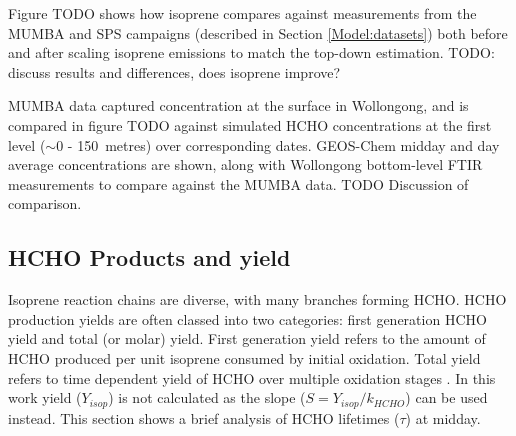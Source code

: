     
    Figure TODO shows how isoprene compares against measurements from the MUMBA and SPS campaigns (described in Section \ref{Model:datasets}) both before and after scaling isoprene emissions to match the top-down estimation.
    TODO: discuss results and differences, does isoprene improve?
    
    
    MUMBA data captured concentration at the surface in Wollongong, and is compared in figure TODO against simulated HCHO concentrations at the first level ($\sim$0 - 150~metres) over corresponding dates.
    GEOS-Chem midday and day average concentrations are shown, along with Wollongong bottom-level FTIR measurements to compare against the MUMBA data.
    TODO Discussion of comparison.
  
    
  \subsection{HCHO Products and yield}
    \label{BioIsop:results:HCHOYield}
    
    Isoprene reaction chains are diverse, with many branches forming HCHO.
    HCHO production yields are often classed into two categories: first generation HCHO yield and total (or molar) yield.
    First generation yield refers to the amount of HCHO produced per unit isoprene consumed by initial oxidation.
    Total yield refers to time dependent yield of HCHO over multiple oxidation stages \parencite{Wolfe2016}.
    In this work yield ($Y_{isop}$) is not calculated as the slope ($S = Y_{isop}/k_{HCHO}$) can be used instead.
    This section shows a brief analysis of HCHO lifetimes ($\tau$) at midday.
    

